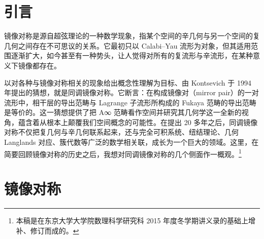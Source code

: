 %

\section{引言}

镜像对称是源自超弦理论的一种数学现象，指某个空间的辛几何与另一个空间的复几何之间存在不可思议的关系。它最初只以 Calabi–Yau 流形为对象，但其适用范围逐渐扩大，如今甚至有一种势头，让人觉得对所有的复流形与辛流形，在某种意义下镜像都存在。

以对各种与镜像对称相关的现象给出概念性理解为目标、由 Kontsevich 于 1994 年提出的猜想，就是同调镜像对称。它断言：在构成镜像对（mirror pair）的一对流形中，相干层的导出范畴与 Lagrange 子流形所构成的 Fukaya 范畴的导出范畴是等价的。这一猜想提供了把 A∞ 范畴看作空间并研究其几何学这一全新的视角，蕴含着从根本上颠覆我们空间概念的可能性。在提出 20 多年之后，同调镜像对称不仅把复几何与辛几何联系起来，还与完全可积系统、纽结理论、几何 Langlands 对应、簇代数等广泛的数学相关联，成长为一个巨大的领域。这里，在简要回顾镜像对称的历史之后，我想对同调镜像对称的几个侧面作一概观。\footnote{本稿是在东京大学大学院数理科学研究科 2015 年度冬学期讲义录的基础上增补、修订而成的。}

\section{镜像对称}

